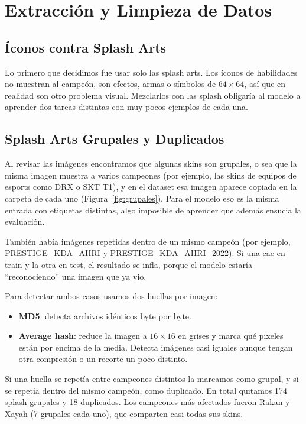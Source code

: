 \documentclass[10pt,twocolumn]{article}
\begin{document}
\section{Extracción y Limpieza de Datos}

\subsection{Íconos contra Splash Arts}

Lo primero que decidimos fue usar solo las splash arts. Los íconos de habilidades no muestran al campeón, son efectos, armas o símbolos de $64\times64$, así que en realidad son otro problema visual. Mezclarlos con las splash obligaría al modelo a aprender dos tareas distintas con muy pocos ejemplos de cada una.

\subsection{Splash Arts Grupales y Duplicados}

Al revisar las imágenes encontramos que algunas skins son grupales, o sea que la misma imagen muestra a varios campeones (por ejemplo, las skins de equipos de esports como DRX o SKT T1), y en el dataset esa imagen aparece copiada en la carpeta de cada uno (Figura~\ref{fig:grupales}). Para el modelo eso es la misma entrada con etiquetas distintas, algo imposible de aprender que además ensucia la evaluación.

También había imágenes repetidas dentro de un mismo campeón (por ejemplo, PRESTIGE\_KDA\_AHRI y PRESTIGE\_KDA\_AHRI\_2022). Si una cae en train y la otra en test, el resultado se infla, porque el modelo estaría ``reconociendo'' una imagen que ya vio.

Para detectar ambos casos usamos dos huellas por imagen:

\begin{itemize}
  \item \textbf{MD5}: detecta archivos idénticos byte por byte.
  \item \textbf{Average hash}: reduce la imagen a $16\times16$ en grises y marca qué pixeles están por encima de la media. Detecta imágenes casi iguales aunque tengan otra compresión o un recorte un poco distinto.
\end{itemize}

Si una huella se repetía entre campeones distintos la marcamos como grupal, y si se repetía dentro del mismo campeón, como duplicado. En total quitamos 174 splash grupales y 18 duplicados. Los campeones más afectados fueron Rakan y Xayah (7 grupales cada uno), que comparten casi todas sus skins.
\end{document}
